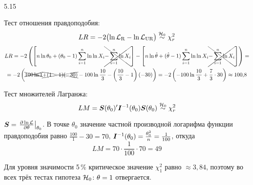 \begin{solution}{{5.15}}
\begin{enumerate}
Тест отношения правдоподобия:
\[
LR = -2 \bigl( \ln \mathcal{L}_{\text{R}} - \ln \mathcal{L}_{\text{UR}} \bigr) \mathrel{\stackrel{\mathcal{H}_0}{\sim}} \chi^2_r
\]
\begin{multline*}
LR = -2 \left( \left[n \ln \theta_0 + (\theta_0-1) \sum\limits_{i=1}^{n} \ln \ln X_i \xcancel{- \sum\limits_{i=1}^{n} \ln X_i}\right] - \left[n \ln \hat\theta + (\hat\theta-1) \sum\limits_{i=1}^{n} \ln \ln X_i \xcancel{- \sum\limits_{i=1}^{n} \ln X_i}\right] \right) = \\
= -2 \left( \xcancel{100 \ln 1} \xcancel{+ (1-1) (-30)}  - 100 \ln \frac{10}{3} - \left(\frac{10}{3}-1 \right) (-30)  \right) = -2 \left( - 100 \ln \frac{10}{3} + \frac73 \cdot 30  \right) \approx 100{,}8
\end{multline*}

Тест множителей Лагранжа:
\[
LM = \boldsymbol{S}({\theta}_0)' \boldsymbol{I}^{-1}({\theta}_{0}) \boldsymbol{S}({\theta}_{0}) \mathrel{\stackrel{\mathcal{H}_0}{\sim}} \chi^2_r
\]

$\boldsymbol{S} = \left.\frac{\partial \ln \mathcal{L}}{\partial \theta}\right|_{\theta_0}$. В точке $\theta_0$ значение частной производной логарифма функции правдоподобия равно $\frac{100}{1} -30=70$, $\boldsymbol{I}^{-1}(\theta_0) = \frac{\theta^2_0}{n} = \frac{1}{100}$, откуда
\[
LM = 70\cdot \frac{1}{100} \cdot 70 = 49
\]

Для уровня значимости 5\,\% критическое значение $\chi^2_1$ равно $\approx3{,}84$, поэтому во всех трёх тестах гипотеза $\mathcal{H}_0\colon \theta=1$ отвергается.

\end{enumerate}

\end{solution}
\protect \hypertarget {soln:5.16}{}
